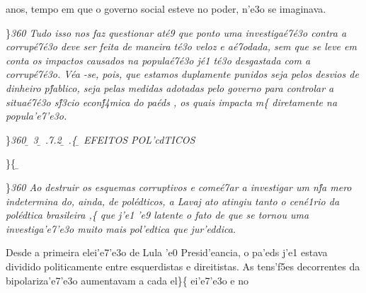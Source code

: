 anos, tempo em que o governo social esteve no poder, n'e3o se imaginava.
\par \}\pard \ltrpar\qj {}\sl360\widctlpar\wrapdefault\faauto{} {\rtlch{}  \ltrch{}  Tudo isso nos faz questionar at\'e9 que ponto uma investiga\'e7\'e3o
 contra a corrup\'e7\'e3o deve ser feita de maneira t\'e3o veloz e a\'e7odada, sem que se leve em conta os impactos causados na popula\'e7\'e3o j\'e1 t\'e3o desgastada com a corrup\'e7\'e3o. V\'ea
-se, pois, que estamos duplamente punidos seja pelos desvios de dinheiro p\'fablico, seja pelas medidas adotadas pelo governo para controlar a situa\'e7\'e3o s\'f3cio econ\'f4mica do pa\'eds}{\rtlch{}  \ltrch{}  , os quais}{
\rtlch{}  \ltrch{}   impacta}{\rtlch{}  \ltrch{}  m}\{\rtlch{}
 \ltrch{}  diretamente na
popula'e7'e3o.
\par \}\pard \ltrpar\qj {}\sl360\widctlpar\wrapdefault\faauto{} {\rtlch{} \ab{} \ltrch{} \b{} 3}{\rtlch{} \ab{} \ltrch{} 
\b{} .7.2}{\rtlch{} \ab{} \ltrch{} \b{} .}\{\rtlch{}
\ab{} \ltrch{} \b{}
EFEITOS POL'cdTICOS \par \}\{\rtlch{} \ab{} \ltrch{}
\b{}
\par \}\pard \ltrpar\qj {}\sl360\widctlpar\wrapdefault\faauto{} {\rtlch{}  \ltrch{}  Ao destruir os esquemas corruptivos e come\'e7ar a investigar um n\'fa
mero indetermina}{\rtlch{}  \ltrch{}  do, ainda, de pol\'edticos, a Lavaj}{\rtlch{}  \ltrch{}  ato atingiu tanto o cen\'e1rio da pol\'edtica brasileira}{\rtlch{}  \ltrch{} 
 ,}\{\rtlch{}  \ltrch{}
 que j'e1 'e9 latente o fato de que se
tornou uma investiga'e7'e3o muito mais pol'edtica que jur'eddica.
\par Desde a primeira elei'e7'e3o de Lula 'e0 Presid'eancia, o pa'eds
j'e1 estava dividido politicamente entre esquerdistas e direitistas. As
tens'f5es decorrentes da bipolariza'e7'e3o aumentavam a cada
el\}\{\rtlch{}  \ltrch{}  ei'e7'e3o e no
